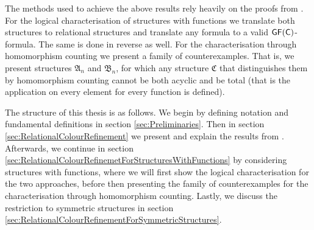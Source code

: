 The methods used to achieve the above results rely heavily on the proofs from \cite{scheidt2025ColorRefinement}.
For the logical characterisation of structures with functions we translate both structures to relational structures and translate any formula to a valid $\mathsf{GF}(\mathsf{C})$-formula.
The same is done in reverse as well.
For the characterisation through homomorphism counting we present a family of counterexamples.
That is, we present structures $\mathfrak A_n$ and $\mathfrak B_n$, for which any structure $\mathfrak C$ that distinguishes them by homomorphism counting cannot be both acyclic and be total (that is the application on every element for every function is defined).

The structure of this thesis is as follows.
We begin by defining notation and fundamental definitions in section \ref{sec:Preliminaries}.
Then in section \ref{sec:RelationalColourRefinement} we present and explain the results from \cite{scheidt2025ColorRefinement}.
Afterwards, we continue in section \ref{sec:RelationalColourRefinemetForStructuresWithFunctions} by considering structures with functions, where we will first show the logical characterisation for the two approaches, before then presenting the family of counterexamples for the characterisation through homomorphism counting.
Lastly, we discuss the restriction to symmetric structures in section \ref{sec:RelationalColourRefinementForSymmetricStructures}.


